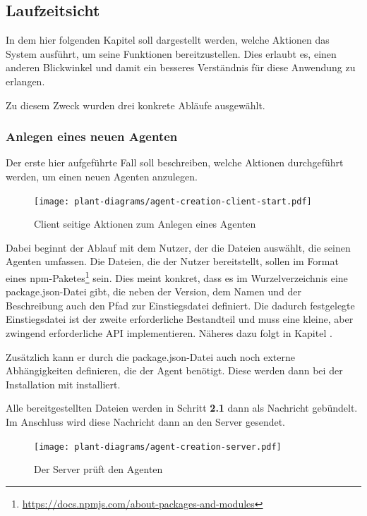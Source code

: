 \subsection{Laufzeitsicht}

In dem hier folgenden Kapitel soll dargestellt werden, welche Aktionen das System ausführt, um seine Funktionen bereitzustellen.
Dies erlaubt es, einen anderen Blickwinkel und damit ein besseres Verständnis für diese Anwendung zu erlangen.

Zu diesem Zweck wurden drei konkrete Abläufe ausgewählt.

\subsubsection{Anlegen eines neuen Agenten}

Der erste hier aufgeführte Fall soll beschreiben, welche Aktionen durchgeführt werden, um einen neuen Agenten anzulegen.

\begin{figure}[htb]
    \centering
    \texttt{[image: plant-diagrams/agent-creation-client-start.pdf]}
    \caption{Client seitige Aktionen zum Anlegen eines Agenten}
    \ownsource
    \label{fig:agent-creation-client-start}
\end{figure}

Dabei beginnt der Ablauf mit dem Nutzer, der die Dateien auswählt, die seinen Agenten umfassen.
Die Dateien, die der Nutzer bereitstellt, sollen im Format eines npm-Paketes\footnote{\url{https://docs.npmjs.com/about-packages-and-modules}} sein.
Dies meint konkret, dass es im Wurzelverzeichnis eine package.json-Datei gibt, die neben der Version, dem Namen und der Beschreibung auch den Pfad zur Einstiegsdatei definiert.
Die dadurch festgelegte Einstiegsdatei ist der zweite erforderliche Bestandteil und muss eine kleine, aber zwingend erforderliche API implementieren.
Näheres dazu folgt in Kapitel .

Zusätzlich kann er durch die package.json-Datei auch noch externe Abhängigkeiten definieren, die der Agent benötigt.
Diese werden dann bei der Installation mit installiert.

Alle bereitgestellten Dateien werden in Schritt \textbf{2.1} dann als Nachricht gebündelt.
Im Anschluss wird diese Nachricht dann an den Server gesendet.

\begin{figure}[tbp]
    \centering
    \texttt{[image: plant-diagrams/agent-creation-server.pdf]}
    \caption{Der Server prüft den Agenten }
    \ownsource
    \label{fig:agent-creation-server}
\end{figure}

